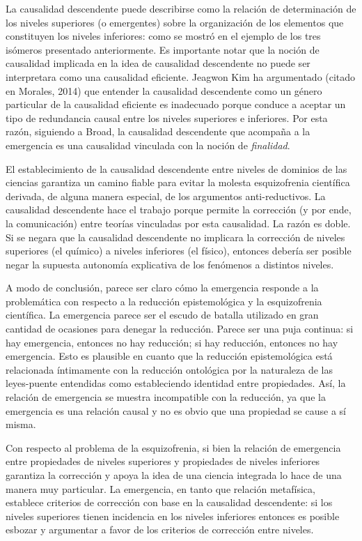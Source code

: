 \documentclass[]{book}
\begin{document}
La causalidad descendente puede describirse como la relación de
determinación de los niveles superiores (o emergentes) sobre la
organización de los elementos que constituyen los niveles inferiores:
como se mostró en el ejemplo de los tres isómeros presentado
anteriormente. Es importante notar que la noción de causalidad implicada
en la idea de causalidad descendente no puede ser interpretara como una
causalidad eficiente. Jeagwon Kim ha argumentado (citado en Morales,
2014) que entender la causalidad descendente como un género particular
de la causalidad eficiente es inadecuado porque conduce a aceptar un
tipo de redundancia causal entre los niveles superiores e inferiores.
Por esta razón, siguiendo a Broad, la causalidad descendente que
acompaña a la emergencia es una causalidad vinculada con la noción de
\emph{finalidad}.

El establecimiento de la causalidad descendente entre niveles de
dominios de las ciencias garantiza un camino fiable para evitar la
molesta esquizofrenia científica derivada, de alguna manera especial, de
los argumentos anti-reductivos. La causalidad descendente hace el
trabajo porque permite la corrección (y por ende, la comunicación) entre
teorías vinculadas por esta causalidad. La razón es doble. Si se negara
que la causalidad descendente no implicara la corrección de niveles
superiores (el químico) a niveles inferiores (el físico), entonces
debería ser posible negar la supuesta autonomía explicativa de los
fenómenos a distintos niveles.

A modo de conclusión, parece ser claro cómo la emergencia responde a la
problemática con respecto a la reducción epistemológica y la
esquizofrenia científica. La emergencia parece ser el escudo de batalla
utilizado en gran cantidad de ocasiones para denegar la reducción.
Parece ser una puja continua: si hay emergencia, entonces no hay
reducción; si hay reducción, entonces no hay emergencia. Esto es
plausible en cuanto que la reducción epistemológica está relacionada
íntimamente con la reducción ontológica por la naturaleza de las
leyes-puente entendidas como estableciendo identidad entre propiedades.
Así, la relación de emergencia se muestra incompatible con la reducción,
ya que la emergencia es una relación causal y no es obvio que una
propiedad se cause a sí misma.

Con respecto al problema de la esquizofrenia, si bien la relación de
emergencia entre propiedades de niveles superiores y propiedades de
niveles inferiores garantiza la corrección y apoya la idea de una
ciencia integrada lo hace de una manera muy particular. La emergencia,
en tanto que relación metafísica, establece criterios de corrección con
base en la causalidad descendente: si los niveles superiores tienen
incidencia en los niveles inferiores entonces es posible esbozar y
argumentar a favor de los criterios de corrección entre niveles.
\end{document}
